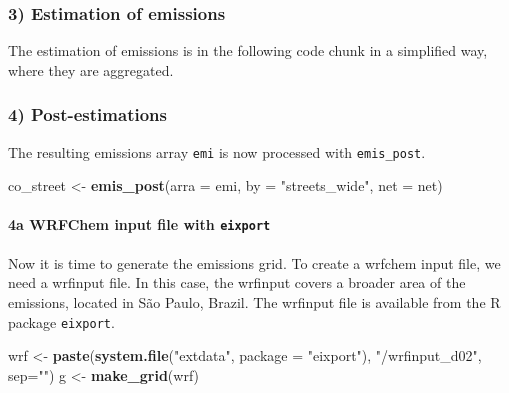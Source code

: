 \documentclass[12pt,graybox,envcountchap,sectrefs]{krantz}
\makeatletter
\newenvironment{Shaded}{\begin{snugshade}}{\end{snugshade}}
\newcommand{\KeywordTok}[1]{\textcolor[rgb]{0.13,0.29,0.53}{\textbf{#1}}}
\newcommand{\DataTypeTok}[1]{\textcolor[rgb]{0.13,0.29,0.53}{#1}}
\newcommand{\DecValTok}[1]{\textcolor[rgb]{0.00,0.00,0.81}{#1}}
\newcommand{\StringTok}[1]{\textcolor[rgb]{0.31,0.60,0.02}{#1}}
\newcommand{\OperatorTok}[1]{\textcolor[rgb]{0.81,0.36,0.00}{\textbf{#1}}}
\newcommand{\NormalTok}[1]{#1}
\let\oldparagraph\paragraph
\renewcommand{\paragraph}[1]{\oldparagraph{#1}\mbox{}}
\newenvironment{kframe}{%
\medskip{}
\setlength{\fboxsep}{.8em}
 \def\at@end@of@kframe{}%
 \ifinner\ifhmode%
  \def\at@end@of@kframe{\end{minipage}}%
  \begin{minipage}{\columnwidth}%
 \fi\fi%
 \def\FrameCommand##1{\hskip\@totalleftmargin \hskip-\fboxsep
 \colorbox{shadecolor}{##1}\hskip-\fboxsep
     \hskip-\linewidth \hskip-\@totalleftmargin \hskip\columnwidth}%
 \MakeFramed {\advance\hsize-\width
   \@totalleftmargin\z@ \linewidth\hsize
   \@setminipage}}%
 {\par\unskip\endMakeFramed%
 \at@end@of@kframe}
\renewenvironment{Shaded}{\begin{kframe}}{\end{kframe}}
\theoremstyle{definition}
\theoremstyle{definition}
\theoremstyle{definition}
\theoremstyle{remark}
\makeatother
\begin{document}
\subsubsection{3) Estimation of
emissions}\label{estimation-of-emissions}

The estimation of emissions is in the following code chunk in a
simplified way, where they are aggregated.

\begin{Shaded}
\end{Shaded}

\subsubsection{4) Post-estimations}\label{post-estimations}

The resulting emissions array \texttt{emi} is now processed with
\texttt{emis\_post}.

\begin{Shaded}
\begin{Highlighting}[]
\NormalTok{co_street <-}\StringTok{ }\KeywordTok{emis_post}\NormalTok{(}\DataTypeTok{arra =}\NormalTok{ emi, }\DataTypeTok{by =} \StringTok{"streets_wide"}\NormalTok{, }\DataTypeTok{net =}\NormalTok{ net)}
\end{Highlighting}
\end{Shaded}

\paragraph{\texorpdfstring{4a WRFChem input file with
\texttt{eixport}}{4a WRFChem input file with eixport}}\label{a-wrfchem-input-file-with-eixport}

Now it is time to generate the emissions grid. To create a wrfchem input
file, we need a wrfinput file. In this case, the wrfinput covers a
broader area of the emissions, located in São Paulo, Brazil. The
wrfinput file is available from the R package \texttt{eixport}.

\begin{Shaded}
\begin{Highlighting}[]
\NormalTok{wrf <-}\StringTok{ }\KeywordTok{paste}\NormalTok{(}\KeywordTok{system.file}\NormalTok{(}\StringTok{"extdata"}\NormalTok{, }\DataTypeTok{package =} \StringTok{"eixport"}\NormalTok{),}
             \StringTok{"/wrfinput_d02"}\NormalTok{, }\DataTypeTok{sep=}\StringTok{""}\NormalTok{)}
\NormalTok{g  <-}\StringTok{ }\KeywordTok{make_grid}\NormalTok{(wrf)}
\end{Highlighting}
\end{Shaded}
\end{document}
